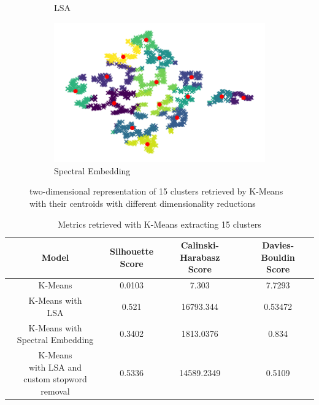 \begin{figure}
\begin{subfigure}{.3\textwidth}
  \caption{LSA}
  \label{fig:kmeans_lsa}
\end{subfigure}%
\begin{subfigure}{.3\textwidth}
  \centering
  \includegraphics[width=\linewidth]{imgs/kmeans_spectral.png}
  \caption{Spectral Embedding}
  \label{fig:kmeans_spectral}
\end{subfigure}
\caption{two-dimensional representation of 15 clusters retrieved by K-Means with their centroids with different dimensionality reductions}
\label{fig:kmeans}
\end{figure}


\begin{table}[]
    \centering
    \begin{tabular}{c|c|c|c}
     Model &  \shortstack[c]{Silhouette \\ Score} & \shortstack[c]{Calinski-Harabasz \\ Score} &  \shortstack[c]{Davies-Bouldin \\ Score}  \\
     \hline
     \hline
     K-Means & 0.0103 & 7.303 & 7.7293 \\
     \hline
     \shortstack[c]{K-Means with \\ LSA} & 0.521 & 16793.344 & 0.53472 \\
     \hline
     \shortstack[c]{K-Means with \\ Spectral Embedding} & 0.3402 & 1813.0376 & 0.834 \\
     \hline
     \shortstack[c]{K-Means \\ with LSA and \\ custom stopword removal} & 0.5336 & 14589.2349 & 0.5109 \\

    \end{tabular}
    \caption{Metrics retrieved with K-Means extracting 15 clusters}
    \label{tab:scores_kmeans}
\end{table}



